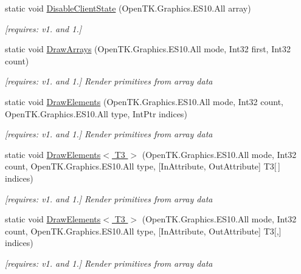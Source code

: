 \begin{DoxyCompactItemize}
static void \hyperlink{class_open_t_k_1_1_graphics_1_1_e_s10_1_1_g_l_a5a4283e0e5ad5e687b4a8eac744ae55a}{Disable\-Client\-State} (Open\-T\-K.\-Graphics.\-E\-S10.\-All array)
\begin{DoxyCompactList}\small\item\em \mbox{[}requires\-: v1. and 1.\mbox{]}\end{DoxyCompactList}\item 
static void \hyperlink{class_open_t_k_1_1_graphics_1_1_e_s10_1_1_g_l_a3d6abebcca2a2fdbfebac04294b204a8}{Draw\-Arrays} (Open\-T\-K.\-Graphics.\-E\-S10.\-All mode, Int32 first, Int32 count)
\begin{DoxyCompactList}\small\item\em \mbox{[}requires\-: v1. and 1.\mbox{]} Render primitives from array data \end{DoxyCompactList}\item 
static void \hyperlink{class_open_t_k_1_1_graphics_1_1_e_s10_1_1_g_l_a3bbaeb44677eecaaf5a700b5c0de02b0}{Draw\-Elements} (Open\-T\-K.\-Graphics.\-E\-S10.\-All mode, Int32 count, Open\-T\-K.\-Graphics.\-E\-S10.\-All type, Int\-Ptr indices)
\begin{DoxyCompactList}\small\item\em \mbox{[}requires\-: v1. and 1.\mbox{]} Render primitives from array data \end{DoxyCompactList}\item 
static void \hyperlink{class_open_t_k_1_1_graphics_1_1_e_s10_1_1_g_l_ac6cfdba2bf5d31d2241fb0b75cca79d4}{Draw\-Elements$<$ T3 $>$} (Open\-T\-K.\-Graphics.\-E\-S10.\-All mode, Int32 count, Open\-T\-K.\-Graphics.\-E\-S10.\-All type, \mbox{[}In\-Attribute, Out\-Attribute\mbox{]} T3\mbox{[}$\,$\mbox{]} indices)
\begin{DoxyCompactList}\small\item\em \mbox{[}requires\-: v1. and 1.\mbox{]} Render primitives from array data \end{DoxyCompactList}\item 
static void \hyperlink{class_open_t_k_1_1_graphics_1_1_e_s10_1_1_g_l_a89293a61c9711b0f80c3e7c8e66b5be8}{Draw\-Elements$<$ T3 $>$} (Open\-T\-K.\-Graphics.\-E\-S10.\-All mode, Int32 count, Open\-T\-K.\-Graphics.\-E\-S10.\-All type, \mbox{[}In\-Attribute, Out\-Attribute\mbox{]} T3\mbox{[},\mbox{]} indices)
\begin{DoxyCompactList}\small\item\em \mbox{[}requires\-: v1. and 1.\mbox{]} Render primitives from array data \end{DoxyCompactList}\item 

\end{DoxyCompactItemize}
